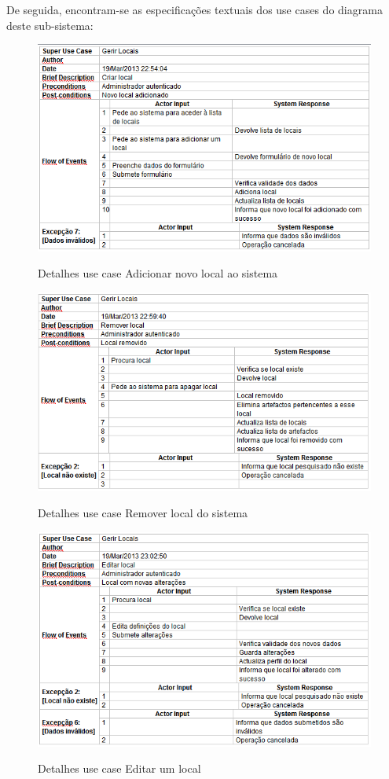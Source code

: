 \documentclass[12pt,a4paper]{article}
\begin{document}
De seguida, encontram-se as especificações textuais dos use cases do diagrama deste sub-sistema:\\

\begin{figure}[h!]
\centering
\includegraphics[scale=0.7]{d_usecase/A_criarlocal}
\label{usecase}
\caption{Detalhes use case Adicionar novo local ao sistema}
\end{figure}

\begin{figure}[h!]
\centering
\includegraphics[scale=0.7]{d_usecase/A_removerlocal}
\label{usecase}
\caption{Detalhes use case Remover local do sistema}
\end{figure}

\begin{figure}[h!]
\centering
\includegraphics[scale=0.7]{d_usecase/A_editarlocal}
\label{usecase}
\caption{Detalhes use case Editar um local}
\end{figure}
\end{document}
